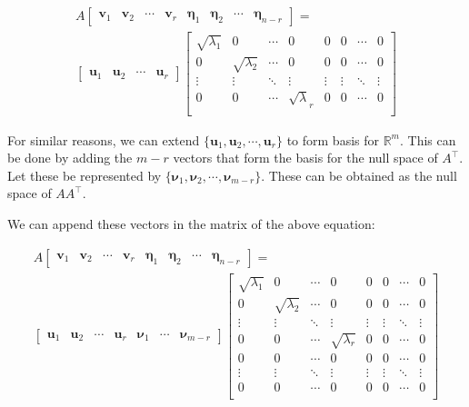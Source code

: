 \documentclass[a4paper]{article}
\begin{document}
\begin{equation}
\begin{aligned}
A \begin{bmatrix}
\boldsymbol{v}_1 & \boldsymbol{v}_2 & \cdots & \boldsymbol{v}_r &  \boldsymbol{\eta}_1 & \boldsymbol{\eta}_2 & \cdots & \boldsymbol{\eta}_{n-r}
\end{bmatrix} = \\ \begin{bmatrix}
\boldsymbol{u}_1 & \boldsymbol{u}_2 & \cdots & \boldsymbol{u}_r
\end{bmatrix} \begin{bmatrix}
\sqrt{\lambda_1} & 0 & \cdots &0 & 0 & 0 & \cdots & 0 \\
0 & \sqrt{\lambda_2} & \cdots & 0 & 0 & 0 & \cdots & 0\\
\vdots & \vdots & \ddots & \vdots & \vdots & \vdots & \ddots & \vdots \\
0 & 0 & \cdots &\sqrt{\lambda}_r & 0 & 0 & \cdots & 0 \\
\end{bmatrix}
\end{aligned}
\end{equation}

For similar reasons, we can extend $\{
\boldsymbol{u}_1, \boldsymbol{u}_2, \cdots, \boldsymbol{u}_r
\}$ to form basis for $\mathbb{R}^m$. This can be done by adding the $m-r$ vectors that form the basis for the null space of $A^{\top}$. Let these be represented by $\{ \boldsymbol{\nu}_1, \boldsymbol{\nu}_2, \cdots, \boldsymbol{\nu}_{m-r} \}$. These can be obtained as the null space of $AA^{\top}$.

We can append these vectors in the matrix of the above equation:

\begin{equation}
\begin{aligned}
A \begin{bmatrix}
\boldsymbol{v}_1 & \boldsymbol{v}_2 & \cdots & \boldsymbol{v}_r &  \boldsymbol{\eta}_1 & \boldsymbol{\eta}_2 & \cdots & \boldsymbol{\eta}_{n-r}
\end{bmatrix} = \\
\begin{bmatrix}
\boldsymbol{u}_1 & \boldsymbol{u}_2 & \cdots & \boldsymbol{u}_r & \boldsymbol{\nu}_1 & \cdots & \boldsymbol{\nu}_{m-r}
\end{bmatrix} \begin{bmatrix}
\sqrt{\lambda_1} & 0 & \cdots &0 & 0 & 0 & \cdots & 0 \\
0 & \sqrt{\lambda_2} & \cdots & 0 & 0 & 0 & \cdots & 0\\
\vdots & \vdots & \ddots & \vdots & \vdots & \vdots & \ddots & \vdots \\
0 & 0 & \cdots & \sqrt{\lambda_r} & 0 & 0 & \cdots & 0 \\
0 & 0 & \cdots & 0 & 0 & 0 & \cdots & 0 \\
\vdots & \vdots & \ddots & \vdots & \vdots & \vdots & \ddots & \vdots \\
0 & 0 & \cdots & 0 & 0 & 0 & \cdots & 0 \\
\end{bmatrix}
\end{aligned}
\end{equation}
\end{document}
